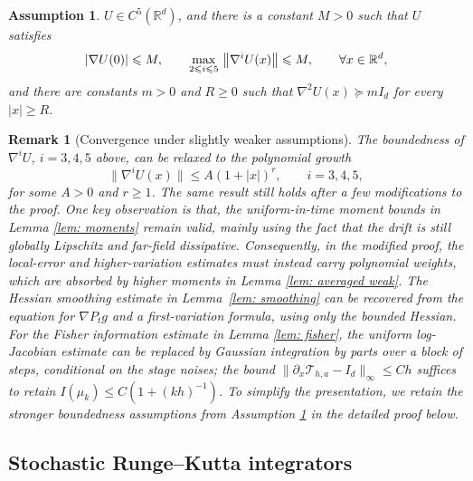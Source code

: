 \documentclass[namedate,webpdf,imanum]{ima-authoring-template}
\newcommand{\Le}{\leqslant}
\newcommand{\Ge}{\geqslant}
\theoremstyle{thmstyletwo}
\newtheorem{assumption}{Assumption}
\newtheorem{remark}{Remark}
\numberwithin{equation}{section}
\begin{document}
\begin{assumption}
	\label{ass: U}
	$U \in C^5(\mathbb R^d)$, and there is a constant $M > 0$ such that $U$ satisfies
	\begin{equation*}
		|\nabla U(0)| \Le M , \qquad \max_{2 \Le i \Le 5}\, \norm{\nabla^i U(x)} \Le M , \qquad \forall x \in \mathbb R^d ,
	\end{equation*}
	and there are constants $m > 0$ and $R \Ge 0$ such that $\nabla^2 U(x) \succeq m I_d$ for every $|x| \Ge R$.
\end{assumption}

\begin{remark}[Convergence under slightly weaker assumptions]
The boundedness of $\nabla^i U$, $i=3,4,5$ above, can be relaxed to the polynomial growth
\[
    \|\nabla^i U(x)\| \Le A(1+|x|)^r,
    \qquad i=3,4,5,
\]
for some $A>0$ and $r\Ge 1$. 
The same result still holds after a few modifications to the proof. One key observation is that, the uniform-in-time moment
bounds in Lemma \ref{lem: moments} remain valid, mainly using the fact that the drift is still globally Lipschitz and far-field dissipative. Consequently, in the modified proof, the local-error and higher-variation
estimates must instead carry polynomial weights, which are
absorbed by higher moments in Lemma \ref{lem: averaged weak}. The Hessian smoothing
estimate in Lemma~\ref{lem: smoothing} can be recovered from the equation for
$\nabla P_tg$ and a first-variation formula, using only the
bounded Hessian. For the Fisher information estimate in Lemma \ref{lem: fisher}, the uniform log-Jacobian estimate
can be replaced by Gaussian integration by parts over a block of
steps, conditional on the stage noises; the bound
$\|\partial_x \mathcal T_{h,a}-I_d\|_\infty\Le Ch$ suffices to retain
$I(\mu_k)\Le C(1+(kh)^{-1})$.
To simplify the presentation, we retain the stronger boundedness assumptions from Assumption \ref{ass: U} in the detailed proof below.
\end{remark}


\subsection{Stochastic Runge--Kutta integrators}
\label{sec: srk}
\end{document}
